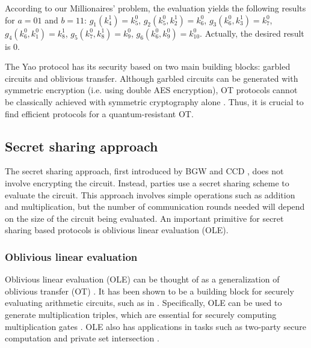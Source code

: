 \begin{enumerate}
    According to our Millionaires' problem, the evaluation yields the following results for $a = 01$ and $b = 11$: $g_1(k_4^1) = k_5^0$, $g_2(k_5^0, k_2^1) = k_6^0$, $g_3(k_6^0, k_3^1) = k_7^0$, $g_4(k_6^0, k_1^0) = k_8^1$, $g_5(k_7^0, k_8^1) = k_9^0$, $g_6(k_6^0, k_9^0) = k_{10}^0$. Actually, the desired result is $0$.
    
\end{enumerate}


The Yao protocol has its security based on two main building blocks: garbled circuits and oblivious transfer. Although garbled circuits can be generated with symmetric encryption (i.e. using double AES encryption), OT protocols cannot be classically achieved with symmetric cryptography alone \citep{IR89}. Thus, it is crucial to find efficient protocols for a quantum-resistant OT.



%
%
%

\subsection{Secret sharing approach}

The secret sharing approach, first introduced by BGW \cite{BGW88} and CCD \cite{CCD88}, does not involve encrypting the circuit. Instead, parties use a secret sharing scheme to evaluate the circuit. This approach involves simple operations such as addition and multiplication, but the number of communication rounds needed will depend on the size of the circuit being evaluated. An important primitive for secret sharing based protocols is oblivious linear evaluation (OLE).

\subsubsection{Oblivious linear evaluation}

Oblivious linear evaluation (OLE) can be thought of as a generalization of oblivious transfer (OT) \cite{Rabin81}. It has been shown to be a building block for securely evaluating arithmetic circuits, such as in \cite{AIK11,DKMQ12,GNN17,DGNBNT17}. Specifically, OLE can be used to generate multiplication triples, which are essential for securely computing multiplication gates \cite{DGNBNT17}. OLE also has applications in tasks such as two-party secure computation \cite{IPS09,ADINZ17,BCGI18,HIMV19,CDIKLOV19} and private set intersection \cite{GN19}.


